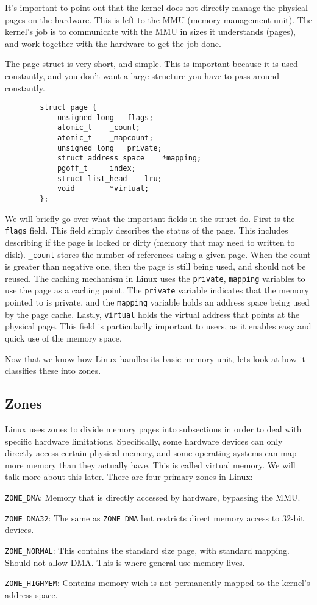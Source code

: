 \documentclass[10pt,letterpaper,onecolumn,draftclsnofoot]{IEEEtran}
\begin{document}
	It's important to point out that the kernel does not directly manage the
	physical pages on the hardware. This is left to the MMU (memory
	management unit). The kernel's job is to communicate with the MMU in
	sizes it understands (pages), and work together with the hardware to
	get the job done. 

	The page struct is very short, and simple. This is important because it
	is used constantly, and you don't want a large structure you have to 
	pass around constantly. \cite{robertlove2010}

	\begin{lstlisting}
		struct page {
			unsigned long	flags;
			atomic_t	_count;
			atomic_t	_mapcount;
			unsigned long	private;
			struct address_space	*mapping;
			pgoff_t		index;
			struct list_head	lru;
			void 		*virtual;
		};
	\end{lstlisting}
	
	We will briefly go over what the important fields in the struct do.
	First is the \texttt{flags} field. This field simply describes the
	status of the page. This includes describing if the page is locked or
	dirty (memory that may need to written to disk). \texttt{\_count}
	stores the number of references using a given page. When the count is
	greater than negative one, then the page is still being used, and should
	not be reused. The caching mechanism in Linux uses the \texttt{private},
	\texttt{mapping} variables to use the page as a caching point. The
	\texttt{private} variable indicates that the memory pointed to is private,
	and the \texttt{mapping} variable holds an address space being used by
	the page cache. Lastly, \texttt{virtual} holds the virtual address that
	points at the physical page. This field is particularlly important to
	users, as it enables easy and quick use of the memory space.

	Now that we know how Linux handles its basic memory unit, lets look at
	how it classifies these into zones. 
  \subsection{Zones}
	Linux uses zones to divide memory pages into subsections in order to
	deal with specific hardware limitations. Specifically, some hardware
	devices can only directly access certain physical memory, and some 
	operating systems can map more memory than they actually have. This is
	called virtual memory. We will talk more about this later. There are
	four primary zones in Linux:
	\begin{description}
		\item \texttt{ZONE\_DMA}: Memory that is directly accessed by
			hardware, bypassing the MMU. 
		\item \texttt{ZONE\_DMA32}: The same as \texttt{ZONE\_DMA} but
			restricts direct memory access to 32-bit devices. 
		\item \texttt{ZONE\_NORMAL}: This contains the standard size
			page, with standard mapping. Should not allow DMA. This
			is where general use memory lives.
		\item \texttt{ZONE\_HIGHMEM}: Contains memory wich is not 
			permanently mapped to the kernel's address space.
	\end{description}
	
\end{document}
